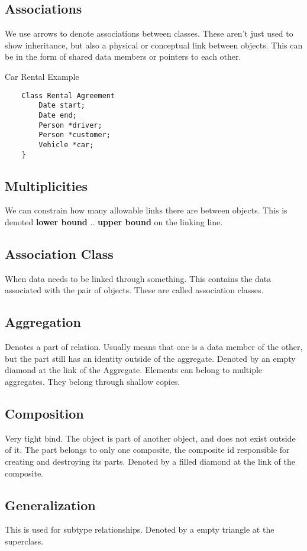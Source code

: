 \documentclass[12pt]{article}
\begin{document}
\subsection*{Associations}
We use arrows to denote associations between classes. These aren't just used to show inheritance, but also a physical or conceptual link between objects. This can be in the form of shared data members or pointers to each other.

Car Rental Example
\begin{verbatim}
    Class Rental Agreement
        Date start;
        Date end;
        Person *driver;
        Person *customer;
        Vehicle *car;
    }
\end{verbatim}

\subsection*{Multiplicities}
We can constrain how many allowable links there are between objects. This is denoted \textbf{lower bound} .. \textbf{upper bound} on the linking line.

\subsection*{Association Class}
When data needs to be linked through something. This contains the data associated with the pair of objects. These are called association classes.

\subsection*{Aggregation}
Denotes a part of relation. Usually means that one is a data member of the other, but the part still has an identity outside of the aggregate. Denoted by an empty diamond at the link of the Aggregate. Elements can belong to multiple aggregates. They belong through shallow copies.

\subsection*{Composition}
Very tight bind. The object is part of another object, and does not exist outside of it. The part belongs to only one composite, the composite id responsible for creating and destroying its parts. Denoted by a filled diamond at the link of the composite.

\subsection*{Generalization}
This is used for subtype relationships. Denoted by a empty triangle at the superclass.
\end{document}
